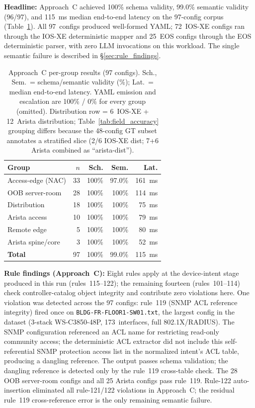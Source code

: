 \documentclass[conference]{IEEEtran}
\begin{document}
\textbf{Headline:} Approach~C achieved 100\% schema validity, 99.0\% semantic validity (96/97), and 115~ms median end-to-end latency on the 97-config corpus (Table~\ref{tab:validity}). All 97~configs produced well-formed YAML; 72~IOS-XE configs ran through the IOS-XE deterministic mapper and 25~EOS configs through the EOS deterministic parser, with zero LLM invocations on this workload. The single semantic failure is described in §\ref{sec:rule_findings}.

\begin{table}[htbp]
\centering
\caption{Approach~C per-group results (97 configs). Sch., Sem.\ = schema/semantic validity (\%); Lat.\ = median end-to-end latency. YAML emission and escalation are 100\% / 0\% for every group (omitted). Distribution row = 6~IOS-XE + 12~Arista distribution; Table~\ref{tab:field_accuracy} grouping differs because the 48-config GT subset annotates a stratified slice (2/6 IOS-XE dist; 7+6 Arista combined as ``arista-dist'').}
\label{tab:validity}
\begin{tabular}{@{}lrrrr@{}}
\toprule
\textbf{Group} & \textbf{$n$} & \textbf{Sch.} & \textbf{Sem.} & \textbf{Lat.} \\
\midrule
Access-edge (NAC)    & 33 & 100\% & 97.0\% & 161~ms \\
OOB server-room      & 28 & 100\% & 100\%  & 114~ms \\
Distribution         & 18 & 100\% & 100\%  &  75~ms \\
Arista access        & 10 & 100\% & 100\%  &  79~ms \\
Remote edge          &  5 & 100\% & 100\%  &  80~ms \\
Arista spine/core    &  3 & 100\% & 100\%  &  52~ms \\
\midrule
\textbf{Total}       & 97 & 100\% & 99.0\% & 115~ms \\
\bottomrule
\end{tabular}
\end{table}

\label{sec:rule_findings}
\textbf{Rule findings (Approach~C):} Eight rules apply at the device-intent stage produced in this run (rules~115--122); the remaining fourteen (rules~101--114) check controller-catalog object integrity and contribute zero violations here. One violation was detected across the 97 configs: rule~119 (SNMP ACL reference integrity) fired once on \texttt{BLDG-FR-FLOOR1-SW01.txt}, the largest config in the dataset (3-stack WS-C3850-48P, 173~interfaces, full 802.1X/RADIUS). The SNMP configuration referenced an ACL name for restricting read-only community access; the deterministic ACL extractor did not include this self-referential SNMP protection access list in the normalized intent's ACL table, producing a dangling reference. The output passes schema validation; the dangling reference is detected only by the rule~119 cross-table check. The 28 OOB server-room configs and all 25 Arista configs pass rule~119. Rule-122 auto-insertion eliminated all rule-121/122 violations in Approach~C; the residual rule~119 cross-reference error is the only remaining semantic failure.
\end{document}
